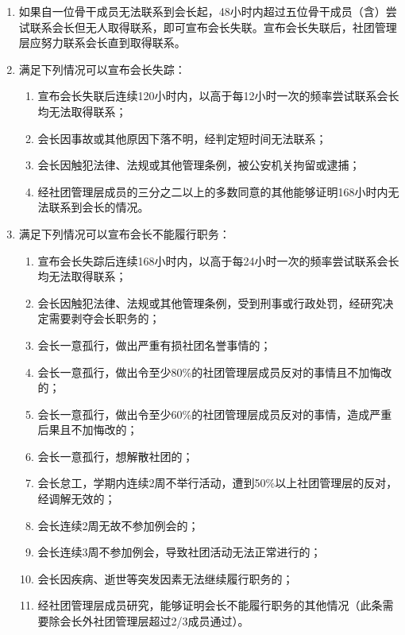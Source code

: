 \begin{enumerate}[resume]
    \item 如果自一位骨干成员无法联系到会长起，48小时内超过五位骨干成员（含）尝试联系会长但无人取得联系，即可宣布会长失联。宣布会长失联后，社团管理层应努力联系会长直到取得联系。
    
    \item 满足下列情况可以宣布会长失踪：
    
    \begin{enumerate}
        \item 宣布会长失联后连续120小时内，以高于每12小时一次的频率尝试联系会长均无法取得联系；
        \item 会长因事故或其他原因下落不明，经判定短时间无法联系；
        \item 会长因触犯法律、法规或其他管理条例，被公安机关拘留或逮捕；
        \item 经社团管理层成员的三分之二以上的多数同意的其他能够证明168小时内无法联系到会长的情况。
    \end{enumerate}

    \item 满足下列情况可以宣布会长不能履行职务：
    
    \begin{enumerate}
        \item 宣布会长失踪后连续168小时内，以高于每24小时一次的频率尝试联系会长均无法取得联系；
        \item 会长因触犯法律、法规或其他管理条例，受到刑事或行政处罚，经研究决定需要剥夺会长职务的；
        \item 会长一意孤行，做出严重有损社团名誉事情的；
        \item 会长一意孤行，做出令至少80\%的社团管理层成员反对的事情且不加悔改的；
        \item 会长一意孤行，做出令至少60\%的社团管理层成员反对的事情，造成严重后果且不加悔改的；
        \item 会长一意孤行，想解散社团的；
        \item 会长怠工，学期内连续2周不举行活动，遭到50\%以上社团管理层的反对，经调解无效的；
        \item 会长连续2周无故不参加例会的；
        \item 会长连续3周不参加例会，导致社团活动无法正常进行的；
        \item 会长因疾病、逝世等突发因素无法继续履行职务的；
        \item 经社团管理层成员研究，能够证明会长不能履行职务的其他情况（此条需要除会长外社团管理层超过2/3成员通过）。
    \end{enumerate}
    

\end{enumerate}
